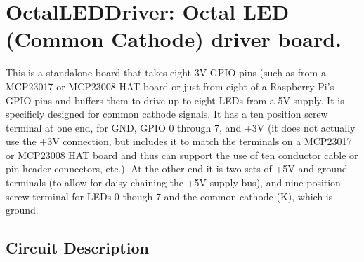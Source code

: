 %
%
%
%
% 
%
%
%
%
%
% 
%

\chapter{OctalLEDDriver: Octal LED (Common Cathode) driver board.}

This is a standalone board that takes eight 3V GPIO pins (such as from a MCP23017 
or MCP23008 HAT board or just from eight of a Raspberry Pi's GPIO pins and buffers 
them to drive up to eight LEDs from a 5V supply.  It is specificly designed for 
common cathode signals.  It has a ten position screw terminal at one end, for 
GND, GPIO 0 through 7, and +3V (it does not actually use the +3V connection, 
but includes it to match the terminals on a MCP23017 or MCP23008 HAT board and 
thus can support the use of ten conductor cable or pin header connectors, 
etc.).  At the other end it is two sets of +5V and ground terminals (to allow 
for daisy chaining the +5V supply bus), and nine position screw terminal for 
LEDs 0 though 7 and the common cathode (K), which is ground.

\section{Circuit Description}

